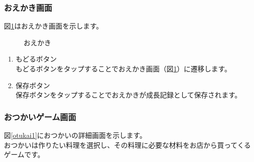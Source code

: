 \documentclass[a4j]{jarticle}
\begin{document}
\newpage
\subsubsection{おえかき画面}
図\ref{oekaki2}はおえかき画面を示します。\\

\begin{figure}[H]
    \begin{center}
    \caption {おえかき}
    \label{oekaki2}
    \end{center}
\end{figure}

\begin{enumerate}
  \renewcommand{\labelenumi}{\textcircled{\scriptsize \theenumi}}
\item もどるボタン\\
  もどるボタンをタップすることでおえかき画面（図\ref{oekaki2}）に遷移します。
\item 保存ボタン\\
  保存ボタンをタップすることでおえかきが成長記録として保存されます。
\end{enumerate}

\newpage
\subsubsection{おつかいゲーム画面}
図\ref{otukai1}におつかいの詳細画面を示します。\\
おつかいは作りたい料理を選択し、その料理に必要な材料をお店から買ってくるゲームです。\\
\end{document}
